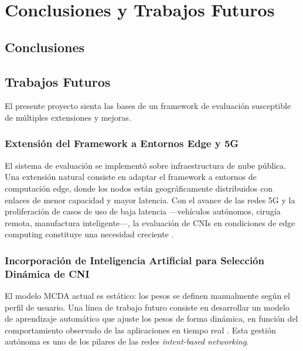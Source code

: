 \section{Conclusiones y Trabajos Futuros}


\subsection{Conclusiones}


\subsection{Trabajos Futuros}

El presente proyecto sienta las bases de un framework de evaluación susceptible de múltiples extensiones y mejoras.

\subsubsection{Extensión del Framework a Entornos Edge y 5G}

El sistema de evaluación se implementó sobre infraestructura de nube pública. Una extensión natural consiste en adaptar el framework a entornos de computación edge, donde los nodos están geográficamente distribuidos con enlaces de menor capacidad y mayor latencia. Con el avance de las redes 5G y la proliferación de casos de uso de baja latencia ---vehículos autónomos, cirugía remota, manufactura inteligente---, la evaluación de CNIs en condiciones de edge computing constituye una necesidad creciente \cite{ref1}.

\subsubsection{Incorporación de Inteligencia Artificial para Selección Dinámica de CNI}

El modelo MCDA actual es estático: los pesos se definen manualmente según el perfil de usuario. Una línea de trabajo futuro consiste en desarrollar un modelo de aprendizaje automático que ajuste los pesos de forma dinámica, en función del comportamiento observado de las aplicaciones en tiempo real \cite{ref2}. Esta gestión autónoma es uno de los pilares de las redes \emph{intent-based networking}.

